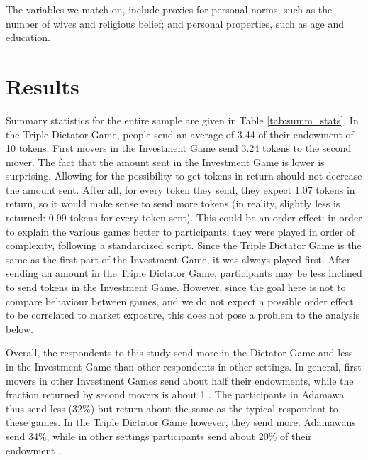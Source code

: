 The variables we match on, include proxies for personal norms, such as the number of wives and religious belief; and personal properties, such as age and education. 






\section{Results}

Summary statistics for the entire sample are given in Table \ref{tab:summ_stats}. In the Triple Dictator Game, people send an average of 3.44 of their endowment of 10 tokens. First movers in the Investment Game send 3.24 tokens to the second mover. The fact that the amount sent in the Investment Game is lower is surprising. Allowing for the possibility to get tokens in return should not decrease the amount sent. After all, for every token they send, they expect 1.07 tokens in return, so it would make sense to send more tokens (in reality, slightly less is returned: 0.99 tokens for every token sent). This could be an order effect: in order to explain the various games better to participants, they were played in order of complexity, following a standardized script. Since the Triple Dictator Game is the same as the first part of the Investment Game, it was always played first. After sending an amount in the Triple Dictator Game, participants may be less inclined to send tokens in the Investment Game. However, since the goal here is not to compare behaviour between games, and we do not expect a possible order effect to be correlated to market exposure, this does not pose a problem to the analysis below.
 
Overall, the respondents to this study send more in the Dictator Game and less in the Investment Game than other respondents in other settings. In general, first movers in other Investment Games send about half their endowments, while the fraction returned by second movers is about 1 \cite[see e.g.][]{Camerer2003,Bohnet2007}. The participants in Adamawa thus send less (32\%) but return about the same as the typical respondent to these games. In the Triple Dictator Game however, they send more.  Adamawans send 34\%, while in other settings participants send about 20\% of their endowment \citep{Bohnet2007,Ashraf2006}.

